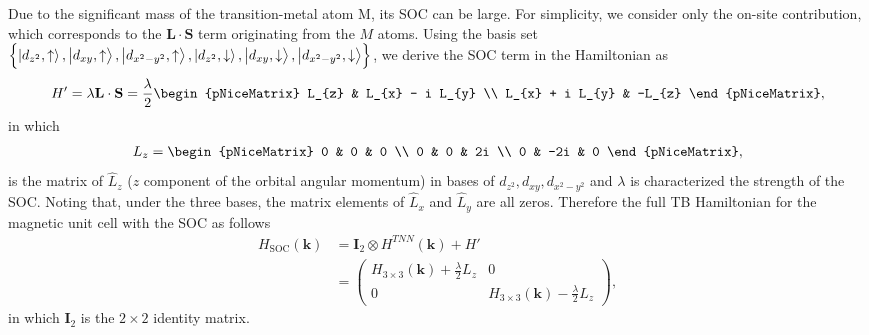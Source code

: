 Due to the significant mass of the transition-metal atom M, its \ac{SOC} can be large. For simplicity, we consider only the on-site contribution, which corresponds to the $\mathbf{L \cdot S}$ term originating from the $M$ atoms. Using the basis set $\left\{\ket{d_{z^{2}},\uparrow},\ket{d_{xy},\uparrow},\ket{d_{x^{2} - y^{2}},\uparrow},\ket{d_{z^{2}},\downarrow},\ket{d_{xy},\downarrow},\ket{d_{x^{2} - y^{2}},\downarrow}\right\}$, we derive the SOC term in the Hamiltonian as
\begin{gather}
	H{'}
	= \lambda \mathbf{L \cdot S}
	= \f{\lambda}{2}
	\begin{pNiceMatrix}
		L_{z}           & L_{x} - i L_{y} \\
		L_{x} + i L_{y} & -L_{z}
	\end{pNiceMatrix},
\end{gather}
in which
\begin{gather}
	L_{z}
	=
	\begin{pNiceMatrix}
		0 & 0   & 0  \\
		0 & 0   & 2i \\
		0 & -2i & 0
	\end{pNiceMatrix},
\end{gather}
is the matrix of $\hat{L}_{z}$ ($z$ component of the orbital angular momentum) in bases of $d_{z^{2}},d_{xy},d_{x^{2} - y^{2}}$ and $\lambda$ is characterized the strength of the \ac{SOC}. Noting that, under the three bases, the matrix elements of $\hat{L}_{x}$ and $\hat{L}_{y}$ are all zeros. Therefore the full \ac{TB} Hamiltonian for the magnetic unit cell with the SOC as follows
\begin{equation}
	\begin{aligned}
		H_{\text{SOC}}(\mathbf{k})
		& = \mathbf{I}_{2} \otimes H^{TNN}(\mathbf{k}) + H{'} \\
		& =
		\begin{pmatrix}
			H_{3 \times 3}(\mathbf{k}) + \frac{\lambda}{2} L_{z} & 0                                                      \\
			0                                                      & H_{3 \times 3}(\mathbf{k}) - \frac{\lambda}{2} L_{z}
		\end{pmatrix},
	\end{aligned}
\end{equation}
in which $\mathbf{I}_{2}$ is the $2\times 2$ identity matrix.
